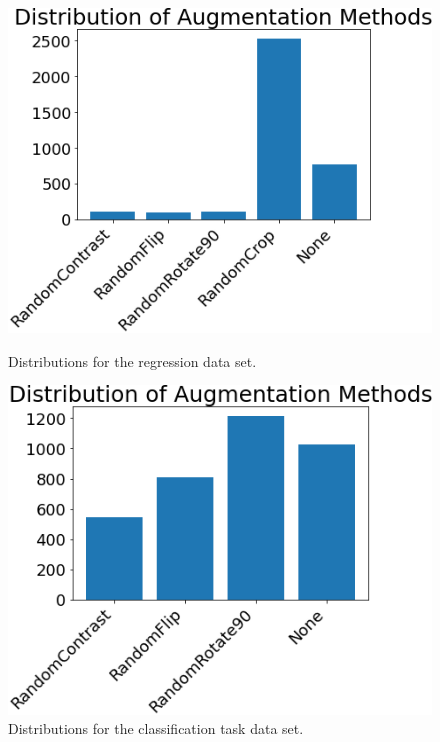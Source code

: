\begin{figure}
    \centering
    \begin{minipage}{.45\textwidth}
        \includegraphics[width=\textwidth]{images/reg-aug-dist.png}
        \caption{Distributions for the regression data set.}
        \label{fig:augmentation-distribution}
    \end{minipage}
    \hfill
    \begin{minipage}{.45\textwidth}
    \includegraphics[width=\textwidth]{images/clf-aug-dist.png}
        \caption{Distributions for the classification task data set.}
        \label{fig:clf-augmentation-distribution}
    \end{minipage}
\end{figure}

